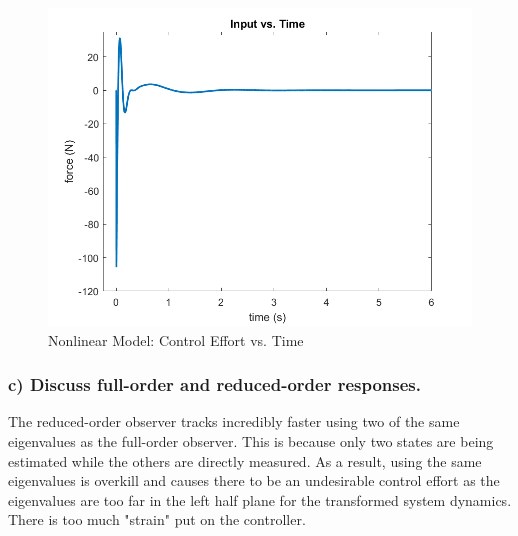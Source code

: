 \documentclass[12pt, letterpaper, onecolumn]{article}
\begin{document}
\begin{figure}[!h]
    \centering
    \includegraphics[width=\linewidth]{figs/p6-a-input.png}
    \caption{Nonlinear Model: Control Effort vs. Time}
    \label{}
\end{figure}

\clearpage

\subsubsection*{c) Discuss full-order and reduced-order responses.}
The reduced-order observer tracks incredibly faster using two of the same eigenvalues as the full-order observer. This is because only two states are being estimated while the others are directly measured. As a result, using the same eigenvalues is overkill and causes there to be an undesirable control effort as the eigenvalues are too far in the left half plane for the transformed system dynamics. There is too much "strain" put on the controller.
\end{document}
